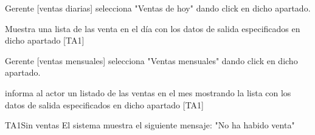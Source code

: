 \begin{UCtrayectoria}{Gerente  [ventas diarias]}
        \UCpaso[\UCactor] selecciona "Ventas de hoy" dando click en dicho apartado.
        
        \UCpaso Muestra una lista de las venta  en el día con los datos de salida especificados en dicho apartado [TA1]

\end{UCtrayectoria}


\begin{UCtrayectoria}{Gerente  [ventas mensuales]}
        \UCpaso[\UCactor] selecciona "Ventas mensuales" dando click en dicho apartado.
        
        \UCpaso informa al actor un listado  de las ventas en el mes mostrando la lista con los datos de salida especificados en dicho apartado [TA1]

\end{UCtrayectoria}

\begin{UCtrayectoriaA}{TA1}{Sin ventas}
    \UCpaso El sistema muestra el siguiente mensaje: "No ha habido venta"
    \end{UCtrayectoriaA}
    

